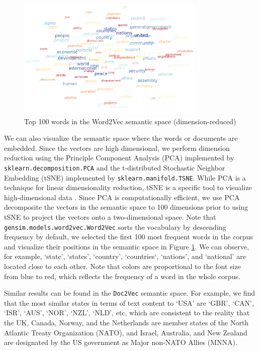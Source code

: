 \documentclass[final,authoryear,3p,12pt,times,hidelinks]{elsarticle}
\begin{document}
\begin{figure}[ht!]
  \begin{center}
    \includegraphics[width=0.8\textwidth]{graphs/word2vec_semantic_space.png}
    \caption{Top 100 words in the Word2Vec semantic space (dimension-reduced)}
    \label{fig:word2vec space}
  \end{center}
\end{figure}

We can also visualize the semantic space where the words or documents are embedded. Since the vectors are high dimensional, we perform dimension reduction using the Principle Component Analysis (PCA) implemented by \texttt{sklearn.decomposition.PCA} and the t-distributed Stochastic Neighbor Embedding (tSNE) implemented by \texttt{sklearn.manifold.TSNE}. While PCA is a technique for linear dimensionality reduction, tSNE is a specific tool to visualize high-dimensional data \citep{maaten2008visualizing}. Since PCA is computationally efficient, we use PCA decomposite the vectors in the semantic space to 100 dimensions prior to using tSNE to project the vectors onto a two-dimensional space. Note that \texttt{gensim.models.word2vec.Word2Vec} sorts the vocabulary by descending frequency by default, we selected the first 100 most frequent words in the corpus and visualize their positions in the semantic space in Figure \ref{fig:word2vec space}. We can observe, for example, `state', `states', `country', `countries`, `nations', and `national' are located close to each other. Note that colors are proportional to the font size from blue to red, which reflects the frequency of a word in the whole corpus. 

Similar results can be found in the \texttt{Doc2Vec} semantic space. For example, we find that the most similar states in terms of text content to `USA' are `GBR', `CAN', `ISR', `AUS', `NOR', `NZL', `NLD', etc, which are consistent to the reality that the UK, Canada, Norway, and the Netherlands are member states of the North Atlantic Treaty Organization (NATO), and Israel, Australia, and New Zealand are designated by the US government as Major non-NATO Allies (MNNA). 
\end{document}
